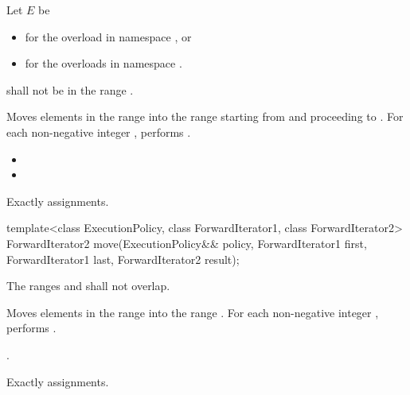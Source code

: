 \begin{itemdescr}
\begin{addedblock}
\pnum
Let $E$ be
\begin{itemize}
\item {} for the overload in namespace , or
\item {} for the overloads in namespace .
\end{itemize}
\end{addedblock}

\pnum
\requires
{}
shall not be in the range
.

\pnum
\effects
Moves elements in the range 
into the range 
starting from  and proceeding to .
For each non-negative integer
 ,
performs
.

\pnum
\returns
\begin{itemize}
\item {} 
\item {}
\end{itemize}

\pnum
\complexity
Exactly
 assignments.
\end{itemdescr}

%
\begin{itemdecl}
template<class ExecutionPolicy, class ForwardIterator1, class ForwardIterator2>
  ForwardIterator2 move(ExecutionPolicy&& policy,
                        ForwardIterator1 first, ForwardIterator1 last,
                        ForwardIterator2 result);
\end{itemdecl}

\begin{itemdescr}
\pnum
\requires The ranges  and
 shall not overlap.

\pnum
\effects Moves elements in the range  into
the range .
For each non-negative integer ,
performs .

\pnum
\returns {}.

\pnum
\complexity Exactly  assignments.
\end{itemdescr}

